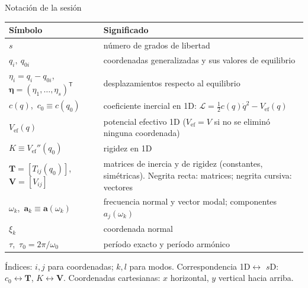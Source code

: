 \documentclass[spanish]{beamer}
\newcommand{\Tm}{\mathbf{T}}              %
\newcommand{\Vm}{\mathbf{V}}              %
\newcommand{\bfeta}{\boldsymbol{\eta}}    %
\newcommand{\ba}{\boldsymbol{a}}          %
\newcommand{\Vef}{V_{\mathrm{ef}}}
\begin{document}
\begin{frame}{Notación de la sesión}
\footnotesize
\begin{tabular}{@{}L{0.37\textwidth}L{0.6\textwidth}@{}}
\toprule
\textbf{Símbolo} & \textbf{Significado} \\
\midrule
$s$ & número de grados de libertad \\
$q_i,\ q_{0i}$ & coordenadas generalizadas y sus valores de equilibrio \\
$\eta_i=q_i-q_{0i}$,\ $\bfeta=(\eta_1,\ldots,\eta_s)^{\mathsf T}$ & desplazamientos respecto al equilibrio \\
$c(q)$,\ $c_0\equiv c(q_0)$ & coeficiente inercial en 1D: $\mathcal{L}=\tfrac12 c(q)\dot q^2-\Vef(q)$ \\
$\Vef(q)$ & potencial efectivo 1D ($\Vef=V$ si no se eliminó ninguna coordenada) \\
$K\equiv \Vef''(q_0)$ & rigidez en 1D \\
$\Tm=[T_{ij}(q_0)]$,\ $\Vm=[V_{ij}]$ & matrices de inercia y de rigidez (constantes, simétricas). Negrita recta: matrices; negrita cursiva: vectores \\
$\omega_k$,\ $\ba_k\equiv\ba(\omega_k)$ & frecuencia normal y vector modal; componentes $a_j(\omega_k)$ \\
$\xi_k$ & coordenada normal \\
$\tau$,\ $\tau_0=2\pi/\omega_0$ & período exacto y período armónico \\
\bottomrule
\end{tabular}

\medskip
Índices: $i,j$ para coordenadas; $k,l$ para modos. Correspondencia 1D$\leftrightarrow$ $s$D: $c_0\leftrightarrow\Tm$, $K\leftrightarrow\Vm$. Coordenadas cartesianas: $x$ horizontal, $y$ vertical hacia arriba.
\end{frame}

\end{document}
